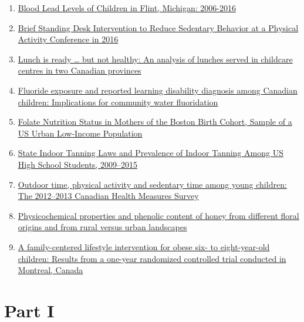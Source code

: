 \documentclass[]{book}
\providecommand{\tightlist}{%
  \setlength{\itemsep}{0pt}\setlength{\parskip}{0pt}}
\providecommand{\tightlist}{%
  \setlength{\itemsep}{0pt}\setlength{\parskip}{0pt}}
\theoremstyle{definition}
\theoremstyle{definition}
\theoremstyle{definition}
\theoremstyle{remark}
\begin{document}
\begin{enumerate}
\def\labelenumi{\arabic{enumi}.}
\tightlist
\item
  \href{https://www.dropbox.com/s/m8up4gyzyj5ll4z/BloodLeadLevelsFlint20062016.pdf?dl=1}{Blood
  Lead Levels of Children in Flint, Michigan: 2006-2016}
\item
  \href{https://www.dropbox.com/s/xzlyb8ugbp32maz/BriefStandingDeskIntervention.pdf?dl=1}{Brief
  Standing Desk Intervention to Reduce Sedentary Behavior at a Physical
  Activity Conference in 2016}
\item
  \href{https://www.dropbox.com/s/6hi90dr47wqczph/ContentOfChilCareCentreLunches.pdf?dl=1}{Lunch
  is ready \ldots{} but not healthy: An analysis of lunches served in
  childcare centres in two Canadian provinces}
\item
  \href{https://www.dropbox.com/s/i2gegxdqyzdzhe9/FluorideLearningDisability.pdf?dl=1}{Fluoride
  exposure and reported learning disability diagnosis among Canadian
  children: Implications for community water fluoridation}
\item
  \href{https://www.dropbox.com/s/oudh0hxb51ypekk/FolateStatusMothersBostonBirthCohort.pdf?dl=1}{Folate
  Nutrition Status in Mothers of the Boston Birth Cohort, Sample of a US
  Urban Low-Income Population}
\item
  \href{https://www.dropbox.com/s/3p2y7pwltda6age/IndoorTanningUSHighSchoolStudents.pdf?dl=1}{State
  Indoor Tanning Laws and Prevalence of Indoor Tanning Among US High
  School Students, 2009--2015}
\item
  \href{https://www.dropbox.com/s/6lvyh0c7go0ix2i/OutdoorTimePhySActivityKids.pdf?dl=1}{Outdoor
  time, physical activity and sedentary time among young children: The
  2012--2013 Canadian Health Measures Survey}
\item
  \href{https://www.dropbox.com/s/vz13rhygidw131d/PropertiesDifferenHoneys.pdf?dl=1}{Physicochemical
  properties and phenolic content of honey from different floral origins
  and from rural versus urban landscapes}
\item
  \href{https://www.dropbox.com/s/lmvrcgs80uqncf3/RCTlifestyleInterventionObeseKids.pdf?dl=1}{A
  family-centered lifestyle intervention for obese six- to
  eight-year-old children: Results from a one-year randomized controlled
  trial conducted in Montreal, Canada}
\end{enumerate}

\part{Part I}\label{part-part-i}
\end{document}
